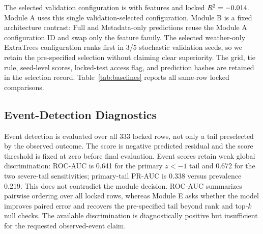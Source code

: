 \documentclass[conference]{IEEEtran}
\begin{document}
The selected validation configuration is \AuditSelectedModel{} with
\AuditSelectedFamily{} features and locked $R^2=-0.014{}$. Module A
uses this single validation-selected configuration. Module B is a fixed
architecture contrast: Full and Metadata-only predictions reuse the Module A
configuration ID and swap only the feature family. The selected weather-only
ExtraTrees configuration ranks first in 3/5 stochastic validation seeds, so we
retain the pre-specified selection without claiming clear superiority. The grid,
tie rule, seed-level scores, locked-test access flag, and prediction hashes are
retained in the selection record. Table~\ref{tab:baselines} reports all same-row
locked comparisons.

\begin{table}[t]
\centering
\caption{Locked 2016--2025 same-task audit. Learned-model predictions are seed
aggregated. $\Delta$RMSE is model minus zero-residual RMSE with paired 95\%
year-block intervals; RMSE is t ha$^{-1}$. The Module B contrast is computed
directly as Full-minus-Metadata; in this panel it matches Full-minus-zero
because Metadata-only predictions coincide with the zero-residual vector to
floating-point precision.}
\label{tab:baselines}
\scriptsize
\resizebox{\textwidth}{!}{}
\end{table}

\subsection{Event-Detection Diagnostics}
Event detection is evaluated over all 333 locked rows, not only a tail preselected
by the observed outcome. The score is negative predicted residual and the score
threshold is fixed at zero before final evaluation. Event scores retain weak
global discrimination: ROC-AUC is 0.641 for the primary $z<-1$ tail and 0.672 for
the two severe-tail sensitivities; primary-tail PR-AUC is 0.338 versus prevalence
0.219. This does not contradict the module decision. ROC-AUC summarizes pairwise
ordering over all locked rows, whereas Module E asks whether the model improves
paired error and recovers the pre-specified tail beyond rank and top-$k$ null
checks. The available discrimination is diagnostically positive but insufficient
for the requested observed-event claim.
\end{document}

